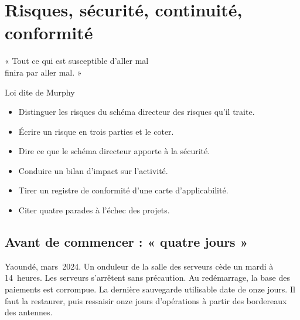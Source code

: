 
\chapter{Risques, sécurité, continuité, conformité}
\label{chap:maitriser}

\epigraph{%
    « Tout ce qui est susceptible d'aller mal\\
    finira par aller mal. »%
}{Loi dite de Murphy}


\begin{boxobjectifs}
\begin{itemize}
    \item Distinguer les risques du schéma directeur des risques qu'il traite.
    \item Écrire un risque en trois parties et le coter.
    \item Dire ce que le schéma directeur apporte à la sécurité.
    \item Conduire un bilan d'impact sur l'activité.
    \item Tirer un registre de conformité d'une carte d'applicabilité.
    \item Citer quatre parades à l'échec des projets.
\end{itemize}
\end{boxobjectifs}

\bigskip

\section*{Avant de commencer : « quatre jours »}

Yaoundé, mars~2024. Un onduleur de la salle des serveurs cède un mardi à 14~heures. Les serveurs s'arrêtent sans
précaution. Au redémarrage, la base des paiements est corrompue. La dernière sauvegarde utilisable date de onze
jours. Il faut la restaurer, puis ressaisir onze jours d'opérations à partir des bordereaux des antennes.

